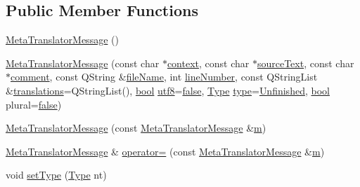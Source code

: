 \subsection*{Public Member Functions}
\begin{DoxyCompactItemize}
\item 
\hyperlink{classMetaTranslatorMessage_ad1641f58215ae614643845e81932fdc3}{Meta\+Translator\+Message} ()
\item 
\hyperlink{classMetaTranslatorMessage_a9f6e6e591cff73ba22e609afe0a1d156}{Meta\+Translator\+Message} (const char $\ast$\hyperlink{classTranslatorMessage_a6458de49df3e922836b7ca119da62381}{context}, const char $\ast$\hyperlink{classTranslatorMessage_adc41c2ef47b12966ac00d3bcc7d6a6e9}{source\+Text}, const char $\ast$\hyperlink{classTranslatorMessage_afacd6b0ed6fddab4e5c686a6577c50a4}{comment}, const Q\+String \&\hyperlink{classTranslatorMessage_a215130997a8e69215669c319162de60d}{file\+Name}, int \hyperlink{classTranslatorMessage_a321cbc7d11b8d11cbe6d51df73a564b7}{line\+Number}, const Q\+String\+List \&\hyperlink{classTranslatorMessage_ad302db7bc501402af00ae6dedcfead88}{translations}=Q\+String\+List(), \hyperlink{compiler_8h_abb452686968e48b67397da5f97445f5b}{bool} \hyperlink{classMetaTranslatorMessage_a805d1e09445433557e18d1867e341b51}{utf8}=\hyperlink{compiler_8h_a65e9886d74aaee76545e83dd09011727}{false}, \hyperlink{classMetaTranslatorMessage_aa632f55202c89ec7fa02c7c3a6b8acc7}{Type} \hyperlink{fftw__dct_8c_a7aead736a07eaf25623ad7bfa1f0ee2d}{type}=\hyperlink{classMetaTranslatorMessage_aa632f55202c89ec7fa02c7c3a6b8acc7adfbe862cd6b227cd718a79d087bc61c7}{Unfinished}, \hyperlink{compiler_8h_abb452686968e48b67397da5f97445f5b}{bool} plural=\hyperlink{compiler_8h_a65e9886d74aaee76545e83dd09011727}{false})
\item 
\hyperlink{classMetaTranslatorMessage_ac3a63b4de84f8aa94ccb2c9db364c6bc}{Meta\+Translator\+Message} (const \hyperlink{classMetaTranslatorMessage}{Meta\+Translator\+Message} \&\hyperlink{indexexpr_8h_ab72fdb4031d47b75ab26dd18a437bcdc}{m})
\item 
\hyperlink{classMetaTranslatorMessage}{Meta\+Translator\+Message} \& \hyperlink{classMetaTranslatorMessage_a0f6add605d84b4e130cc27bbb6de69e7}{operator=} (const \hyperlink{classMetaTranslatorMessage}{Meta\+Translator\+Message} \&\hyperlink{indexexpr_8h_ab72fdb4031d47b75ab26dd18a437bcdc}{m})
\item 
void \hyperlink{classMetaTranslatorMessage_ad2f802d50ff09c219ef75a294ac53223}{set\+Type} (\hyperlink{classMetaTranslatorMessage_aa632f55202c89ec7fa02c7c3a6b8acc7}{Type} nt)

\end{DoxyCompactItemize}
